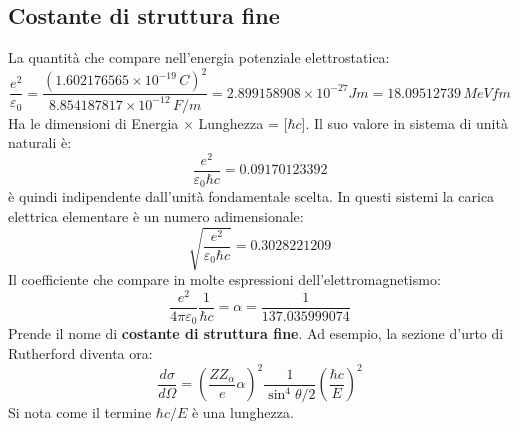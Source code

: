 \subsection{Costante di struttura fine}
La quantità che compare nell'energia potenziale elettrostatica: 
\begin{equation*}
    \frac{e^2}{\varepsilon_0}=\frac{(1.602176565\times10^{-19}\,C)^2}{8.854187817\times10^{-12}\,F/m}=2.899158908\times10^{-27}Jm=18.09512739\,MeVfm
\end{equation*}
Ha le dimensioni di Energia $\times$ Lunghezza = [$\hbar c$]. Il suo valore in sistema di unità naturali è:
\begin{equation*}
    \frac{e^2}{\varepsilon_0\hbar c}=0.09170123392
\end{equation*}
è quindi indipendente dall'unità fondamentale scelta. In questi sistemi la carica elettrica elementare è un numero adimensionale:
\begin{equation*}
    \sqrt{\frac{e^2}{\varepsilon_0\hbar c}}=0.3028221209
\end{equation*}
Il coefficiente che compare in molte espressioni dell'elettromagnetismo:
\begin{equation*}
    \frac{e^2}{4\pi\varepsilon_0}\frac{1}{\hbar c}=\alpha=\frac{1}{137.035999074}
\end{equation*}
Prende il nome di \textbf{costante di struttura fine}. Ad esempio, la sezione d'urto di Rutherford diventa ora:
\begin{equation*}
    \frac{d\sigma}{d\Omega}=\left(\frac{ZZ_\alpha}{e}\alpha\right)^2\frac{1}{\sin^4{\theta/2}}\left(\frac{\hbar c}{E}\right)^2
\end{equation*}
Si nota come il termine $\hbar c/E$ è una lunghezza.

